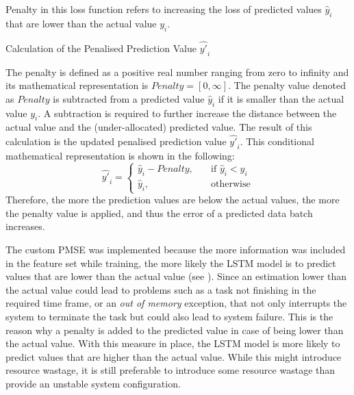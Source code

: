     Penalty in this loss function refers to increasing the loss of predicted values $\hat{y}_i$ that are lower than the actual value $y_i$.

    \begin{pabox}{Calculation of the Penalised Prediction Value $\hat{y'}_i$}
    \label{def:calculation-of-the-penalty-value}

      The penalty is defined as a positive real number ranging from zero to infinity and its mathematical representation is $Penalty = [0, \infty]$.
      The penalty value denoted as $Penalty$ is subtracted from a predicted value $\hat{y}_i$ if it is smaller than the actual value $y_i$. A subtraction is required to further increase the distance between the actual value and the (under-allocated) predicted value.
      The result of this calculation is the updated penalised prediction value $\hat{y'}_i$.
      This conditional mathematical representation is shown in the following:
      $$\hat{y'}_i = 
      \begin{cases}
        \hat{y}_i - Penalty, & \quad \textrm{if } \hat{y}_i < y_i \\
        \hat{y}_i,  & \quad \textrm{otherwise}
      \end{cases}$$
      Therefore, the more the prediction values are below the actual values, the more the penalty value is applied, and thus the error of a predicted data batch increases.

    \end{pabox}

    The custom PMSE was implemented because the more information was included in the feature set while training, the more likely the LSTM model is to predict values that are lower than the actual value (see ). Since an estimation lower than the actual value could lead to problems such as a task not finishing in the required time frame, or an \emph{out of memory} exception, that not only interrupts the system to terminate the task but could also lead to system failure. This is the reason why a penalty is added to the predicted value in case of being lower than the actual value. With this measure in place, the LSTM model is more likely to predict values that are higher than the actual value. While this might introduce resource wastage, it is still preferable to introduce some resource wastage than provide an unstable system configuration.

